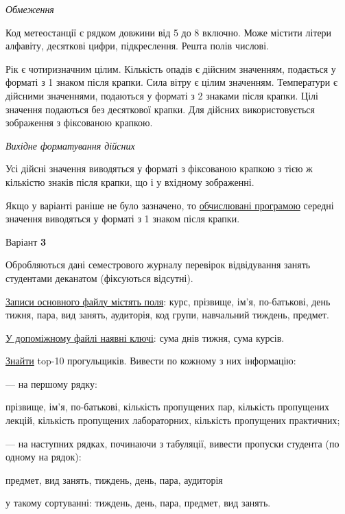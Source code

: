 \documentclass[11pt, ukrainian]{article}
\begin{document}

\bigskip\textit{Обмеження}

Код метеостанції є рядком довжини від 5 до 8 включно.
Може містити літери алфавіту, десяткові цифри, підкреслення. Решта полів числові.

Рік є чотиризначним цілим.
Кількість опадів є дійсним значенням, подається у форматі з 1 знаком після крапки.
Сила вітру є цілим значенням.
Температури є дійсними значеннями, подаються у форматі з 2 знаками після крапки.
Цілі значення подаються без десяткової крапки.
Для дійсних використовується зображення з фіксованою крапкою.

\textit{Вихідне форматування дійсних}

Усі дійсні значення виводяться у форматі з фіксованою крапкою з тією ж кількістю знаків після крапки, що і у вхідному зображенні.

Якщо у варіанті раніше не було зазначено, то \underline{обчислювані програмою} середні значення виводяться у форматі з 1 знаком після крапки.




\par
\newpage
{\center Варіант  \No \textbf { 3 }\par}
\bigskip
Обробляються дані семестрового журналу перевірок відвідування занять студентами деканатом (фіксуються відсутні). 

\underline{Записи основного файлу містять поля}: курс, прізвище, ім’я, по-батькові, день тижня, пара, вид занять, аудиторія, код групи, навчальний тиждень, предмет.

\underline{У допоміжному файлі наявні ключі}: сума днів тижня, сума курсів.

\underline{Знайти} top-10 прогульщиків. Вивести по кожному з них інформацію:\par
{\noindent}--- на першому рядку:\par
прізвище, ім’я, по-батькові, кількість пропущених пар, кількість пропущених лекцій, кількість пропущених лабораторних, кількість пропущених практичних;

{\noindent}--- на наступних рядках, починаючи з табуляції, вивести пропуски студента (по одному на рядок):\par
предмет, вид занять, тиждень, день, пара, аудиторія

{\noindent}у такому сортуванні: тиждень, день, пара, предмет, вид занять.
\end{document}
